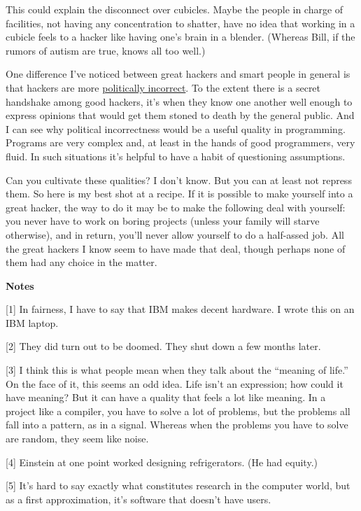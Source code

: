This could explain the disconnect over cubicles. Maybe the people in
charge of facilities, not having any concentration to shatter, have no
idea that working in a cubicle feels to a hacker like having one's brain
in a blender. (Whereas Bill, if the rumors of autism are true, knows all
too well.)

One difference I've noticed between great hackers and smart people in
general is that hackers are more \href{say.html}{politically incorrect}.
To the extent there is a secret handshake among good hackers, it's when
they know one another well enough to express opinions that would get
them stoned to death by the general public. And I can see why political
incorrectness would be a useful quality in programming. Programs are
very complex and, at least in the hands of good programmers, very fluid.
In such situations it's helpful to have a habit of questioning
assumptions.

Can you cultivate these qualities? I don't know. But you can at least
not repress them. So here is my best shot at a recipe. If it is possible
to make yourself into a great hacker, the way to do it may be to make
the following deal with yourself: you never have to work on boring
projects (unless your family will starve otherwise), and in return,
you'll never allow yourself to do a half-assed job. All the great
hackers I know seem to have made that deal, though perhaps none of them
had any choice in the matter.

\textbf{Notes}

{[}1{]} In fairness, I have to say that IBM makes decent hardware. I
wrote this on an IBM laptop.

{[}2{]} They did turn out to be doomed. They shut down a few months
later.

{[}3{]} I think this is what people mean when they talk about the
``meaning of life.'' On the face of it, this seems an odd idea. Life
isn't an expression; how could it have meaning? But it can have a
quality that feels a lot like meaning. In a project like a compiler, you
have to solve a lot of problems, but the problems all fall into a
pattern, as in a signal. Whereas when the problems you have to solve are
random, they seem like noise.

{[}4{]} Einstein at one point worked designing refrigerators. (He had
equity.)

{[}5{]} It's hard to say exactly what constitutes research in the
computer world, but as a first approximation, it's software that doesn't
have users.

